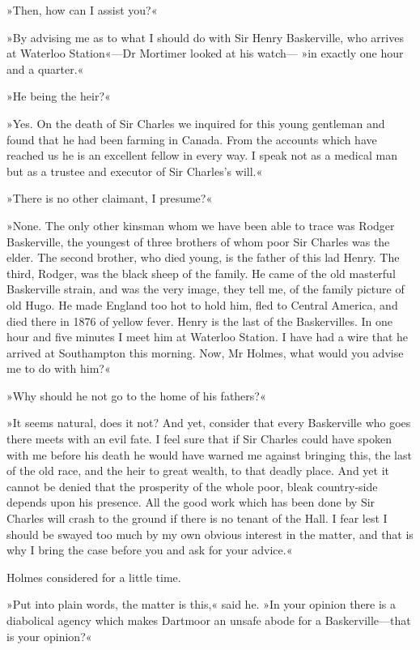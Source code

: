 »Then, how can I assist you?«

»By advising me as to what I should do with Sir Henry Baskerville, who arrives at Waterloo Station«—Dr Mortimer looked at his watch— »in exactly one hour and a quarter.«

»He being the heir?«

»Yes. On the death of Sir Charles we inquired for this young gentleman and found that he had been farming in Canada. From the accounts which have reached us he is an excellent fellow in every way. I speak not as a medical man but as a trustee and executor of Sir Charles's will.«

»There is no other claimant, I presume?«

»None. The only other kinsman whom we have been able to trace was Rodger Baskerville, the youngest of three brothers of whom poor Sir Charles was the elder. The second brother, who died young, is the father of this lad Henry. The third, Rodger, was the black sheep of the family. He came of the old masterful Baskerville strain, and was the very image, they tell me, of the family picture of old Hugo. He made England too hot to hold him, fled to Central America, and died there in 1876 of yellow fever. Henry is the last of the Baskervilles. In one hour and five minutes I meet him at Waterloo Station. I have had a wire that he arrived at Southampton this morning. Now, Mr Holmes, what would you advise me to do with him?«

»Why should he not go to the home of his fathers?«

»It seems natural, does it not? And yet, consider that every Baskerville who goes there meets with an evil fate. I feel sure that if Sir Charles could have spoken with me before his death he would have warned me against bringing this, the last of the old race, and the heir to great wealth, to that deadly place. And yet it cannot be denied that the prosperity of the whole poor, bleak country-side depends upon his presence. All the good work which has been done by Sir Charles will crash to the ground if there is no tenant of the Hall. I fear lest I should be swayed too much by my own obvious interest in the matter, and that is why I bring the case before you and ask for your advice.«

Holmes considered for a little time.

»Put into plain words, the matter is this,« said he. »In your opinion there is a diabolical agency which makes Dartmoor an unsafe abode for a Baskerville—that is your opinion?«

